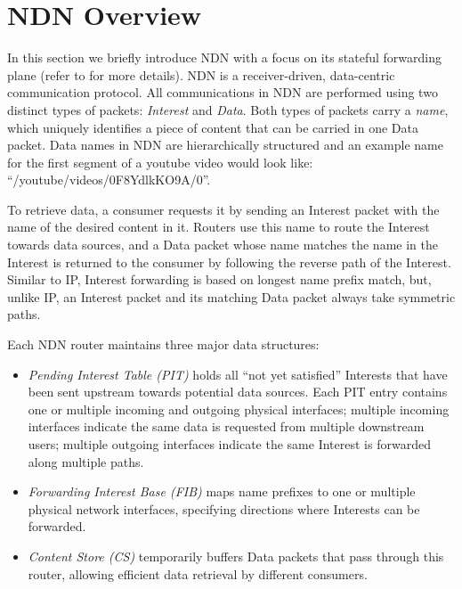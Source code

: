 \documentclass[10pt,conference]{IEEEtran}
\newcommand{\ndnName}[1]{``{\nicettfont #1}''}
\begin{document}
\section{NDN Overview\label{sec:ccn-intro}}

In this section we briefly introduce NDN with a focus on its stateful forwarding plane (refer to \cite{ndn-conext, ndn-tr, adaptive-forwarding, Yi:2013:A-Case-for-Stateful} for more details).
NDN is a receiver-driven, data-centric communication protocol.
All communications in NDN are performed using two distinct types of packets: \textit{Interest} and \textit{Data}. Both types of packets carry a \textit{name}, which uniquely identifies a piece of content that can be carried in one Data packet. Data names in NDN are hierarchically structured and an example name for the first segment of a youtube video would look like: \ndnName{/youtube/videos/0F8YdlkKO9A/0}.

To retrieve data, a consumer requests it by sending an Interest packet with the name of the desired content in it.
Routers use this name to route the Interest towards data sources, and a Data packet whose name matches the name in the Interest is returned to the consumer by following the reverse path of the Interest. Similar to IP, Interest forwarding is based on longest name prefix match, but, unlike IP, an Interest packet and its matching Data packet always take symmetric paths.

Each NDN router maintains three major data structures:
\begin{itemize}
\item \textit{Pending Interest Table (PIT)} holds all ``not yet satisfied'' Interests that have been sent upstream towards potential data sources. Each PIT entry contains one or multiple incoming and outgoing physical interfaces; multiple incoming interfaces indicate the same data is requested from multiple downstream users; multiple outgoing interfaces indicate the same Interest is forwarded along multiple paths.
\item \textit{Forwarding Interest Base (FIB)} maps name prefixes to one or multiple physical network interfaces, specifying directions where Interests can be forwarded. 
\item \textit{Content Store (CS)} temporarily buffers Data packets that pass through this router, allowing efficient data retrieval by different consumers.
\end{itemize}
\end{document}

